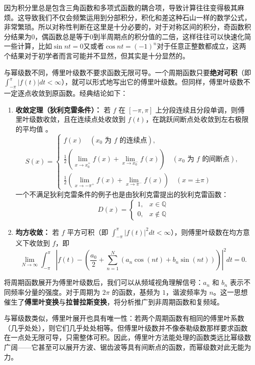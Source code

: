 \documentclass[UTF8]{ctexbook}
\begin{document}
因为积分里总是包含三角函数和多项式函数的耦合项，导致计算往往变得极其麻烦。这导致我们不仅会频繁运用到分部积分，积化和差这种石山一样的数学公式，非常繁琐。所以对称性判断在这里是十分必要的，对于对称区间的积分，奇函数积分结果为0，偶函数总是等于0到半周期点的积分值的二倍，这样往往可以快速化简一些计算，比如$\sin nt = 0$又或者$\cos nt = (-1)^n$对于任意正整数都成立，这两个结果对于初学者而言可能并不显然，但其实是十分显然的。


与幂级数不同，傅里叶级数不要求函数无限可导。一个周期函数只要\textbf{绝对可积}（即 $\int_{-\pi}^{\pi} |f(t)| dt < \infty$），就可以形式地写出它的傅里叶级数。但同样，傅里叶级数不一定逐点收敛到原函数。经典结论如下：

\begin{enumerate}
    \item \textbf{收敛定理（狄利克雷条件）：} 若 $f$ 在 $[-\pi,\pi]$ 上分段连续且分段单调，则傅里叶级数收敛，且在连续点处收敛到 $f(t)$，在跳跃间断点处收敛到左右极限的平均值 。
    \[
S(x)=\begin{cases}
f(x) \quad (x_0 \text{ 为 } f \text{ 的连续点}),\\
\frac{1}{2}\left( \lim_{x \to x_0^+} f(x) + \lim_{x \to x_0^-} f(x) \right) \quad (x_0 \text{ 为 } f \text{ 的间断点}),\\
\frac{1}{2}\left( \lim_{x \to -\pi^+} f(x) + \lim_{x \to \pi^-} f(x) \right) \quad (x = \pm \pi)
\end{cases}
\]
一个不满足狄利克雷条件的例子也是由狄利克雷提出的狄利克雷函数：
\[
D(x) = \begin{cases} 
1, & x \in \mathbb{Q} \\ 
0, & x \notin \mathbb{Q} 
\end{cases}
\]
    \item \textbf{均方收敛：} 若 $f$ 平方可积（即 $\int_{-\pi}^{\pi} |f(t)|^2 dt < \infty$），则傅里叶级数在均方意义下收敛到 $f$，即
    \[
    \lim_{N\to\infty} \int_{-\pi}^{\pi} \left| f(t) - \left( \frac{a_0}{2} + \sum_{n=1}^{N} (a_n \cos(nt) + b_n \sin(nt)) \right) \right|^2 dt = 0.
    \]
\end{enumerate}

将周期函数展开为傅里叶级数后，我们可以从频域视角理解信号：$a_n$ 和 $b_n$ 表示不同频率分量的强度。对于周期为 $2\pi$ 的函数，基频为 $1$，谐波频率为 $n$。这一思想催生了\textbf{傅里叶变换}与\textbf{拉普拉斯变换}，将分析推广到非周期函数和复频域。

与幂级数类似，傅里叶展开也具有唯一性：若两个周期函数有相同的傅里叶系数（几乎处处），则它们几乎处处相等。但傅里叶级数并不像泰勒级数那样要求函数在一点处无限可导，只需整体可积。因此，傅里叶方法能处理的函数类远比幂级数广阔——它甚至可以展开方波、锯齿波等具有间断点的函数，而幂级数对此无能为力。
\end{document}

